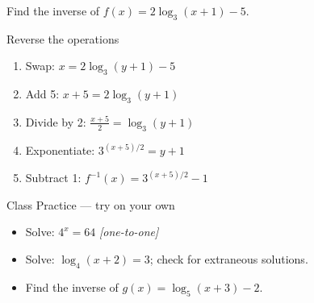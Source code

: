 \documentclass[aspectratio=169, 11pt]{beamer}
\begin{document}
\begin{frame}[t, plain]

  \vspace{0.15cm}
  Find the inverse of $f(x) = 2\log_3(x+1)-5$.

  \begin{block}{Reverse the operations}
    \setlength{\itemsep}{3pt}
    \begin{enumerate}
      \item Swap: $x = 2\log_3(y+1)-5$
      \item Add 5: $x+5 = 2\log_3(y+1)$
      \item Divide by 2: $\tfrac{x+5}{2} = \log_3(y+1)$
      \item Exponentiate: $3^{(x+5)/2} = y+1$
      \item Subtract 1: $f^{-1}(x) = 3^{(x+5)/2}-1$
    \end{enumerate}
  \end{block}

  \vspace{0.15cm}
  \begin{block}{Class Practice --- try on your own}
    \setlength{\itemsep}{4pt}
    \begin{itemize}
      \item Solve: $4^x = 64$ \hfill \textit{[one-to-one]}
      \item Solve: $\log_4(x+2) = 3$; check for extraneous solutions.
      \item Find the inverse of $g(x) = \log_5(x+3)-2$.
    \end{itemize}
  \end{block}
\end{frame}
\end{document}
